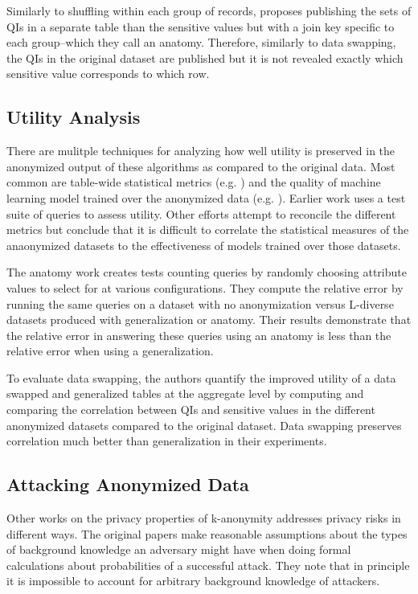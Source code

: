 Similarly to shuffling within each group of records, \cite{xiaoAnatomy} proposes publishing the sets of QIs in a separate table than the sensitive values but with a join key specific to each group--which they call an anatomy. Therefore, similarly to data swapping\cite{soriaSwapping}, the QIs in the original dataset are published but it is not revealed exactly which sensitive value corresponds to which row.

\subsection{Utility Analysis}
There are mulitple techniques for analyzing how well utility is preserved in the anonymized output of these algorithms as compared to the original data. Most common are table-wide statistical metrics (e.g. \cite{soriaSwapping}) and the quality of machine learning model trained over the anonymized data (e.g. \cite{sangogboyePad}). Earlier work\cite{xiaoAnatomy} uses a test suite of queries to assess utility. Other efforts attempt to reconcile the different metrics but conclude that it is difficult to correlate the statistical measures of the anaonymized datasets to the effectiveness of models trained over those datasets\cite{vsarvcevicEffectiveness}.

The anatomy work\cite{xiaoAnatomy} creates tests counting queries by randomly choosing attribute values to select for at various configurations. They compute the relative error by running the same queries on a dataset with no anonymization versus L-diverse datasets produced with generalization or anatomy. Their results demonstrate that the relative error in answering these queries using an anatomy is less than the relative error when using a generalization.

To evaluate data swapping\cite{soriaSwapping}, the authors quantify the improved utility of a data swapped and generalized tables at the aggregate level by computing and comparing the correlation between QIs and sensitive values in the different anonymized datasets compared to the original dataset. Data swapping preserves correlation much better than generalization in their experiments.

\subsection{Attacking Anonymized Data}
Other works on the privacy properties of k-anonymity addresses privacy risks in different ways. The original papers make reasonable assumptions about the types of background knowledge an adversary might have when doing formal calculations about probabilities of a successful attack. They note that in principle it is impossible to account for arbitrary background knowledge of attackers.

